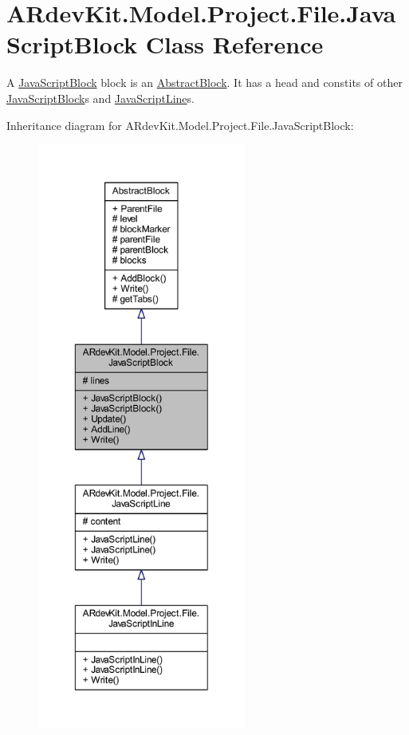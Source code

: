 \hypertarget{class_a_rdev_kit_1_1_model_1_1_project_1_1_file_1_1_java_script_block}{\section{A\-Rdev\-Kit.\-Model.\-Project.\-File.\-Java\-Script\-Block Class Reference}
\label{class_a_rdev_kit_1_1_model_1_1_project_1_1_file_1_1_java_script_block}
}


A \hyperlink{class_a_rdev_kit_1_1_model_1_1_project_1_1_file_1_1_java_script_block}{Java\-Script\-Block} block is an \hyperlink{class_a_rdev_kit_1_1_model_1_1_project_1_1_file_1_1_abstract_block}{Abstract\-Block}. It has a head and constits of other \hyperlink{class_a_rdev_kit_1_1_model_1_1_project_1_1_file_1_1_java_script_block}{Java\-Script\-Block}s and \hyperlink{class_a_rdev_kit_1_1_model_1_1_project_1_1_file_1_1_java_script_line}{Java\-Script\-Line}s.  




Inheritance diagram for A\-Rdev\-Kit.\-Model.\-Project.\-File.\-Java\-Script\-Block\-:
\nopagebreak
\begin{figure}[H]
\begin{center}
\leavevmode
\includegraphics[height=550pt]{class_a_rdev_kit_1_1_model_1_1_project_1_1_file_1_1_java_script_block__inherit__graph}
\end{center}
\end{figure}


